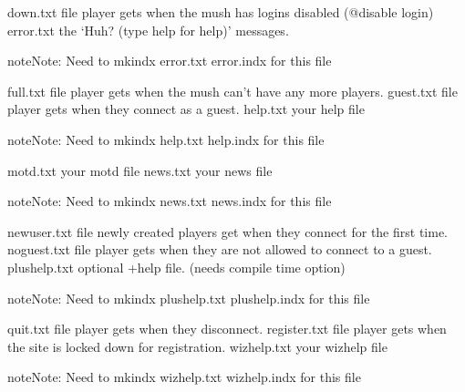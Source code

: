 \documentclass[letterpaper,10pt,english]{sphinxmanual}
\begin{document}
\sphinxAtStartPar
down.txt               \sphinxhyphen{} file player gets when the mush has logins disabled (@disable login)
error.txt              \sphinxhyphen{} the ‘Huh? (type help for help)’ messages.

\begin{sphinxadmonition}{note}{Note:}
\sphinxAtStartPar
Need to mkindx error.txt error.indx for this file
\end{sphinxadmonition}

\sphinxAtStartPar
full.txt               \sphinxhyphen{} file player gets when the mush can’t have any more players.
guest.txt              \sphinxhyphen{} file player gets when they connect as a guest.
help.txt               \sphinxhyphen{} your help file

\begin{sphinxadmonition}{note}{Note:}
\sphinxAtStartPar
Need to mkindx help.txt help.indx for this file
\end{sphinxadmonition}

\sphinxAtStartPar
motd.txt               \sphinxhyphen{} your motd file
news.txt               \sphinxhyphen{} your news file

\begin{sphinxadmonition}{note}{Note:}
\sphinxAtStartPar
Need to mkindx news.txt news.indx for this file
\end{sphinxadmonition}

\sphinxAtStartPar
newuser.txt            \sphinxhyphen{} file newly created players get when they connect for the first time.
noguest.txt            \sphinxhyphen{} file player gets when they are not allowed to connect to a guest.
plushelp.txt           \sphinxhyphen{} optional +help file. (needs compile time option)

\begin{sphinxadmonition}{note}{Note:}
\sphinxAtStartPar
Need to mkindx plushelp.txt plushelp.indx for this file
\end{sphinxadmonition}

\sphinxAtStartPar
quit.txt               \sphinxhyphen{} file player gets when they disconnect.
register.txt           \sphinxhyphen{} file player gets when the site is locked down for registration.
wizhelp.txt            \sphinxhyphen{} your wizhelp file

\begin{sphinxadmonition}{note}{Note:}
\sphinxAtStartPar
Need to mkindx wizhelp.txt wizhelp.indx for this file
\end{sphinxadmonition}
\end{document}
